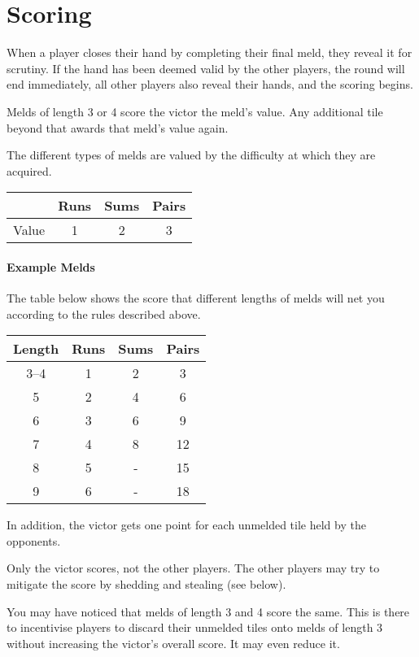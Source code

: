 \section{Scoring}\label{sec:scoring}
When a player closes their hand by completing their final meld, they reveal it for scrutiny. 
If the hand has been deemed valid by the other players, the round will end immediately, all other players also reveal their hands, and the scoring begins.

Melds of length 3 or 4 score the victor the meld's value. Any additional tile beyond that awards that meld's value again.

The different types of melds are valued by the difficulty at which they are acquired.

\begin{center}
    \begin{tabular}{c||c|c|c}
              & Runs & Sums & Pairs\\\hline\hline
        Value & 1 & 2 & 3\\
    \end{tabular}
\end{center}

\paragraph{Example Melds}
The table below shows the score that different lengths of melds will net you according to the rules described above.
\begin{center}
    \begin{tabular}{c||c|c|c}
        Length & Runs & Sums & Pairs\\\hline\hline
        3--4 & 1 &  2 &  3 \\
           5 & 2 &  4 &  6 \\
           6 & 3 &  6 &  9 \\
           7 & 4 &  8 & 12 \\
           8 & 5 &  - & 15 \\
           9 & 6 &  - & 18 \\
    \end{tabular}
\end{center}
In addition, the victor gets one point for each unmelded tile held by the opponents.

\note Only the victor scores, not the other players. The other players may try to mitigate the score by shedding and stealing (see below).

\aside You may have noticed that melds of length 3 and 4 score the same. This is there to incentivise players to discard their unmelded tiles onto melds of length 3 without increasing the victor's overall score. It may even reduce it.

